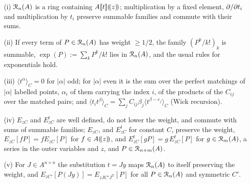 \begin{lem}
\label{lem:fsp-ring}
(i) $\mathcal{R}_n(A)$ is a ring containing $A[\![ t ]\!](\!(z)\!)$; multiplication by a fixed element, $\partial/\partial t_i$ and multiplication by $t_i$ preserve summable families and commute with their sums.

(ii) If every term of $P\in\mathcal{R}_n(A)$ has weight $\geq1/2$, the family $(P^k/k!)_k$ is summable, $\exp(P):=\sum_kP^k/k!$ lies in $\mathcal{R}_n(A)$, and the usual rules for exponentials hold.

(iii) $\langle t^\alpha\rangle_C=0$ for $|\alpha|$ odd; for $|\alpha|$ even it is the sum over the perfect matchings of $|\alpha|$ labelled points, $\alpha_i$ of them carrying the index $i$, of the products of the $C_{ij}$ over the matched pairs; and $\langle t_it^\beta\rangle_C=\sum_jC_{ij}\beta_j\langle t^{\beta-e_j}\rangle_C$ (Wick recursion).

(iv) $E_{zC}$ and $E^t_{zC}$ are well defined, do not lower the weight, and commute with sums of summable families; $E_{zC}$, and $E^t_{zC}$ for constant $C$, preserve the weight, $E_{zC}[fP]=fE_{zC}[P]$ for $f\in A(\!(z)\!)$, and $E^t_{zC}[gP]=g\,E^t_{zC}[P]$ for $g\in\mathcal{R}_m(A)$, a series in the outer variables and $z$, and $P\in\mathcal{R}_{n+m}(A)$.

(v) For $J\in A^{n\times n}$ the substitution $t=Jy$ maps $\mathcal{R}_n(A)$ to itself preserving the weight, and $E_{zC'}[P(Jy)]=E_{zJC'J^{\mathrm T}}[P]$ for all $P\in\mathcal{R}_n(A)$ and symmetric $C'$.
\end{lem}

